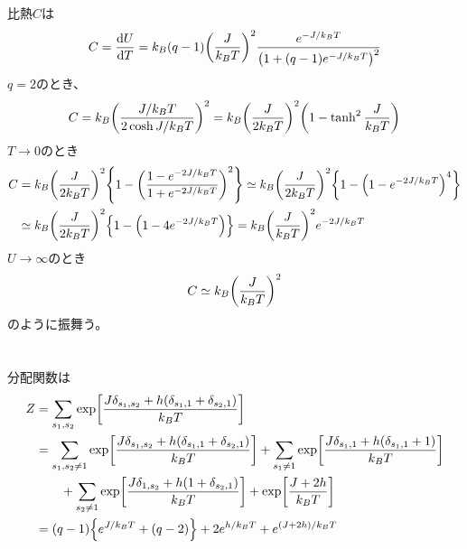 \documentclass[../ap_2009.tex]{subfiles}
\begin{document}
\section{}
比熱\(C\)は
\begin{equation}\begin{aligned}[b]
    C=\dv{U}{T} = k_B(q-1) \qty(\frac{J}{k_BT})^2\frac{e^{-J/k_BT}}{\qty(1+(q-1)e^{-J/k_BT})^2}
\end{aligned}\end{equation}
\(q=2\)のとき、
\begin{equation}\begin{aligned}[b]
    C = k_B\qty(\frac{J/k_BT}{2\cosh J/k_BT})^2=k_B\qty(\frac{J}{2k_BT})^2\qty(1-\tanh^2\frac{J}{k_BT})
\end{aligned}\end{equation}
\(T\to0\)のとき
\begin{equation}\begin{aligned}[b]
    C &= k_B\qty(\frac{J}{2k_BT})^2\qty{1-\qty(\frac{1-e^{-2J/k_BT}}{1+e^{-2J/k_BT}})^2}
    \simeq k_B\qty(\frac{J}{2k_BT})^2\qty{1-\qty(1-e^{-2J/k_BT})^4}\\
    &\simeq k_B\qty(\frac{J}{2k_BT})^2\qty{1-\qty(1-4e^{-2J/k_BT})}
    = k_B \qty(\frac{J}{k_BT})^2e^{-2J/k_BT}
\end{aligned}\end{equation}
\(U\to\infty\)のとき
\begin{equation}\begin{aligned}[b]
    C \simeq k_B\qty(\frac{J}{k_BT})^2
\end{aligned}\end{equation}
のように振舞う。

\section{}
分配関数は
\begin{equation}\begin{aligned}[b]
    Z &= \sum_{s_1,s_2}\exp[\frac{J\delta_{s_1,s_2}+h(\delta_{s_1,1}+\delta_{s_2,1})}{k_BT}]\\
    &= \sum_{s_1,s_2\neq 1}\exp[\frac{J\delta_{s_1,s_2}+h(\delta_{s_1,1}+\delta_{s_2,1})}{k_BT}]
    +\sum_{s_1\neq 1}\exp[\frac{J\delta_{s_1,1}+h(\delta_{s_1,1}+1)}{k_BT}]\\
    &\qquad +\sum_{s_2\neq 1}\exp[\frac{J\delta_{1,s_2}+h(1+\delta_{s_2,1})}{k_BT}]
    +\exp[\frac{J+2h}{k_BT}]\\
    &=(q-1)\qty{e^{J/k_BT}+(q-2)}+2e^{h/k_BT}+e^{(J+2h)/k_BT}
\end{aligned}\end{equation}
\end{document}
